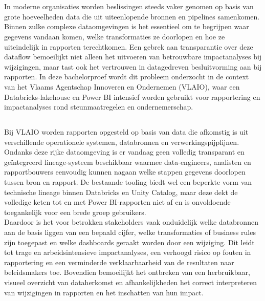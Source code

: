 
\chapter{}%
\label{ch:inleiding}

In moderne organisaties worden beslissingen steeds vaker genomen op basis van grote hoeveelheden data die uit uiteenlopende bronnen en pipelines samenkomen. Binnen zulke complexe dataomgevingen is het essentieel om te begrijpen waar gegevens vandaan komen, welke transformaties ze doorlopen en hoe ze uiteindelijk in rapporten terechtkomen. Een gebrek aan transparantie over deze dataflow bemoeilijkt niet alleen het uitvoeren van betrouwbare impactanalyses bij wijzigingen, maar tast ook het vertrouwen in datagedreven besluitvorming aan bij rapporten. In deze bachelorproef wordt dit probleem onderzocht in de context van het Vlaams Agentschap Innoveren en Ondernemen (VLAIO), waar een Databricks-lakehouse en Power BI intensief worden gebruikt voor rapportering en impactanalyses rond steunmaatregelen en ondernemerschap.

\section{}%
\label{sec:probleemstelling}

Bij VLAIO worden rapporten opgesteld op basis van data die afkomstig is uit verschillende operationele systemen, databronnen en verwerkingspijplijnen. Ondanks deze rijke dataomgeving is er vandaag geen volledig transparant en geïntegreerd lineage-systeem beschikbaar waarmee data-engineers, analisten en rapportbouwers eenvoudig kunnen nagaan welke stappen gegevens doorlopen tussen bron en rapport. De bestaande tooling biedt wel een beperkte vorm van technische lineage binnen Databricks en Unity Catalog, maar deze dekt de volledige keten tot en met Power BI-rapporten niet af en is onvoldoende toegankelijk voor een brede groep gebruikers.\\

Daardoor is het voor betrokken stakeholders vaak onduidelijk welke databronnen aan de basis liggen van een bepaald cijfer, welke transformaties of business rules zijn toegepast en welke dashboards geraakt worden door een wijziging. Dit leidt tot trage en arbeidsintensieve impactanalyses, een verhoogd risico op fouten in rapportering en een verminderde verklaarbaarheid van de resultaten naar beleidsmakers toe. Bovendien bemoeilijkt het ontbreken van een herbruikbaar, visueel overzicht van dataherkomst en afhankelijkheden het correct interpreteren van wijzigingen in rapporten en het inschatten van hun impact.\\

